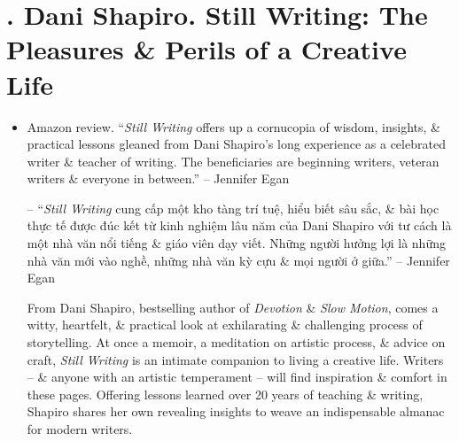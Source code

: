 \documentclass{article}
\begin{document}
\section{\cite{Shapiro2014}. {\sc Dani Shapiro}. Still Writing: The Pleasures \& Perils of a Creative Life}
{}
\begin{itemize}
	\item {\sf Amazon review.} ``{\it Still Writing} offers up a cornucopia of wisdom, insights, \& practical lessons gleaned from {\sc Dani Shapiro}'s long experience as a celebrated writer \& teacher of writing. The beneficiaries are beginning writers, veteran writers \& everyone in between.'' -- {\sc Jennifer Egan}
	
	-- ``{\it Still Writing} cung cấp một kho tàng trí tuệ, hiểu biết sâu sắc, \& bài học thực tế được đúc kết từ kinh nghiệm lâu năm của {\sc Dani Shapiro} với tư cách là một nhà văn nổi tiếng \& giáo viên dạy viết. Những người hưởng lợi là những nhà văn mới vào nghề, những nhà văn kỳ cựu \& mọi người ở giữa.'' -- {\sc Jennifer Egan}
	
	From {\sc Dani Shapiro}, bestselling author of {\it Devotion} \& {\it Slow Motion}, comes a witty, heartfelt, \& practical look at exhilarating \& challenging process of storytelling. At once a memoir, a meditation on artistic process, \& advice on craft, {\it Still Writing} is an intimate companion to living a creative life. Writers -- \& anyone with an artistic temperament -- will find inspiration \& comfort in these pages. Offering lessons learned over 20 years of teaching \& writing, {\sc Shapiro} shares her own revealing insights to weave an indispensable almanac for modern writers.
	

\end{itemize}
\end{document}
